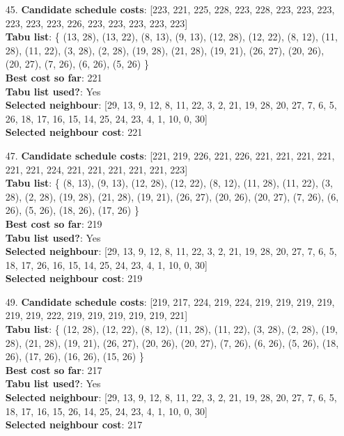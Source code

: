 \documentclass[fleqn]{article}
\begin{document}
\begin{itemize}
    \item[45.] \textbf{Candidate schedule costs}: [223, 221, 225, 228, 223, 228, 223, 223, 223, 223, 223, 223, 226, 223, 223, 223, 223, 223] \\
    \textbf{Tabu list}: \{ (13, 28), (13, 22), (8, 13), (9, 13), (12, 28), (12, 22), (8, 12), (11, 28), (11, 22), (3, 28), (2, 28), (19, 28), (21, 28), (19, 21), (26, 27), (20, 26), (20, 27), (7, 26), (6, 26), (5, 26) \} \\
    \textbf{Best cost so far}: 221 \\
    \textbf{Tabu list used?}: Yes \\
    \textbf{Selected neighbour}: [29, 13, 9, 12, 8, 11, 22, 3, 2, 21, 19, 28, 20, 27, 7, 6, 5, 26, 18, 17, 16, 15, 14, 25, 24, 23, 4, 1, 10, 0, 30] \\
    \textbf{Selected neighbour cost}: 221
      

    \item[47.] \textbf{Candidate schedule costs}: [221, 219, 226, 221, 226, 221, 221, 221, 221, 221, 221, 224, 221, 221, 221, 221, 221, 223] \\
    \textbf{Tabu list}: \{ (8, 13), (9, 13), (12, 28), (12, 22), (8, 12), (11, 28), (11, 22), (3, 28), (2, 28), (19, 28), (21, 28), (19, 21), (26, 27), (20, 26), (20, 27), (7, 26), (6, 26), (5, 26), (18, 26), (17, 26) \} \\
    \textbf{Best cost so far}: 219 \\
    \textbf{Tabu list used?}: Yes \\
    \textbf{Selected neighbour}: [29, 13, 9, 12, 8, 11, 22, 3, 2, 21, 19, 28, 20, 27, 7, 6, 5, 18, 17, 26, 16, 15, 14, 25, 24, 23, 4, 1, 10, 0, 30] \\
    \textbf{Selected neighbour cost}: 219
      

    \item[49.] \textbf{Candidate schedule costs}: [219, 217, 224, 219, 224, 219, 219, 219, 219, 219, 219, 222, 219, 219, 219, 219, 219, 221] \\
    \textbf{Tabu list}: \{ (12, 28), (12, 22), (8, 12), (11, 28), (11, 22), (3, 28), (2, 28), (19, 28), (21, 28), (19, 21), (26, 27), (20, 26), (20, 27), (7, 26), (6, 26), (5, 26), (18, 26), (17, 26), (16, 26), (15, 26) \} \\
    \textbf{Best cost so far}: 217 \\
    \textbf{Tabu list used?}: Yes \\
    \textbf{Selected neighbour}: [29, 13, 9, 12, 8, 11, 22, 3, 2, 21, 19, 28, 20, 27, 7, 6, 5, 18, 17, 16, 15, 26, 14, 25, 24, 23, 4, 1, 10, 0, 30] \\
    \textbf{Selected neighbour cost}: 217
      


\end{itemize}
\end{document}
